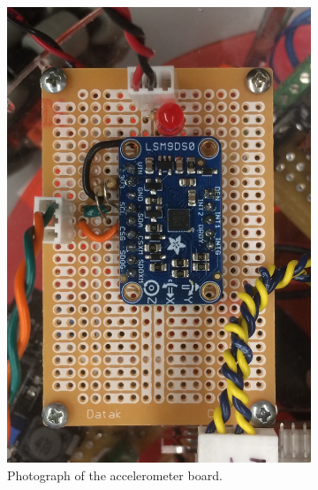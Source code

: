 \documentclass[letterpaper, 11pt]{article}
\begin{document}
\begin{figure}[ht]
    \centering
    \begin{subfigure}[t]{0.48\textwidth}
        \centering
        \includegraphics[height=0.4\textheight]{images/accel.JPG}
        \caption{Photograph of the accelerometer board.}
    \end{subfigure}\hfill
    \begin{subfigure}[t]{0.48\textwidth}
        \centering

\end{subfigure}
\end{figure}
\end{document}
